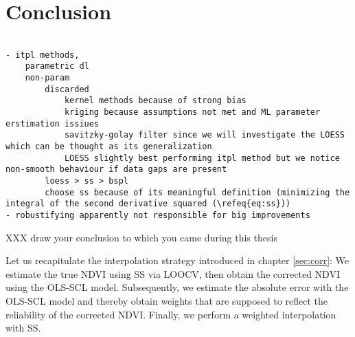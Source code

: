 \chapter{Conclusion}
\label{s:Conclusion}
\begin{verbatim}
    
- itpl methods, 
    parametric dl 
    non-param 
        discarded 
            kernel methods because of strong bias  
            kriging because assumptions not met and ML parameter erstimation issiues
            savitzky-golay filter since we will investigate the LOESS which can be thought as its generalization 
            LOESS slightly best performing itpl method but we notice non-smooth behaviour if data gaps are present
        loess > ss > bspl
        choose ss because of its meaningful definition (minimizing the integral of the second derivative squared (\refeq{eq:ss}))
- robustifying apparently not responsible for big improvements

\end{verbatim}
XXX draw your conclusion to which you came during this thesis

Let us recapitulate the interpolation strategy introduced in chapter \ref{sec:corr}: We estimate the true NDVI using SS via LOOCV, then obtain the corrected NDVI using the OLS-SCL model. Subsequently, we estimate the absolute error with the OLS-SCL model and thereby obtain weights that are supposed to reflect the reliability of the corrected NDVI. Finally, we perform a weighted interpolation with SS.

